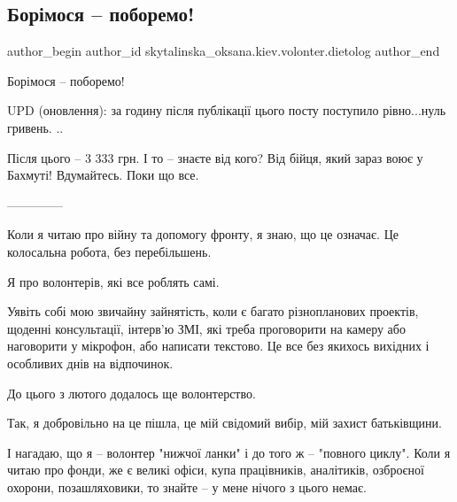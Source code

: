  
 
 
 
 
 
\subsection{Борімося -- поборемо!}
\label{sec:15_11_2022.fb.skytalinska_oksana.kiev.volonter.dietolog.1.borimosja}
 
\ifcmt
 author_begin
   author_id skytalinska_oksana.kiev.volonter.dietolog
 author_end
\fi

Борімося -- поборемо! 

UPD (оновлення): за годину після публікації цього посту поступило рівно...нуль
гривень.  ..

Після цього -- 3 333 грн. І то -- знаєте від кого? Від бійця, який зараз воює у
Бахмуті! Вдумайтесь. Поки що все.

--------------

Коли я читаю про війну та допомогу фронту, я знаю, що це означає. Це колосальна
робота, без перебільшень.

Я про волонтерів, які все роблять самі.

Уявіть собі мою звичайну зайнятість, коли є багато різнопланових проектів,
щоденні консультації, інтерв'ю ЗМІ, які треба проговорити на камеру або
наговорити у мікрофон, або написати текстово. Це все без якихось вихідних і
особливих днів на відпочинок.

До цього з лютого додалось ще волонтерство.

Так, я добровільно на це пішла, це мій свідомий вибір, мій захист батьківщини.

І нагадаю, що я -- волонтер "нижчої ланки" і до того ж -- "повного циклу". Коли
я читаю про фонди, же є великі офіси, купа працівників, аналітиків, озброєної
охорони, позашляховики, то знайте -- у мене нічого з цього немає.

